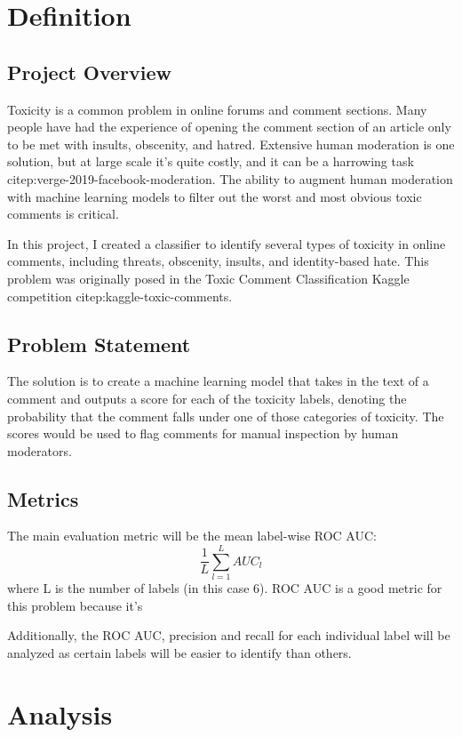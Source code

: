 \documentclass[12pt]{article}
\author{Andrew Pope}
\date{\today}
\title{}
\begin{document}
\section*{Definition}
\label{sec:org12d7149}

\subsection*{Project Overview}
\label{sec:org474a275}
Toxicity is a common problem in online forums and comment sections. Many people have had the experience of opening the comment section of an article only to be met with insults, obscenity, and hatred. Extensive human moderation is one solution, but at large scale it's quite costly, and it can be a harrowing task citep:verge-2019-facebook-moderation. The ability to augment human moderation with machine learning models to filter out the worst and most obvious toxic comments is critical.

In this project, I created a classifier to identify several types of toxicity in online comments, including threats, obscenity, insults, and identity-based hate. This problem was originally posed in the Toxic Comment Classification Kaggle competition citep:kaggle-toxic-comments. 
\subsection*{Problem Statement}
\label{sec:org96b759f}
The solution is to create a machine learning model that takes in the text of a comment and outputs a score for each of the toxicity labels, denoting the probability that the comment falls under one of those categories of toxicity. The scores would be used to flag comments for manual inspection by human moderators.
\subsection*{Metrics}
\label{sec:org0b5d578}
The main evaluation metric will be the mean label-wise ROC AUC:
\begin{equation}
\frac{1}{L} \sum_{l=1}^{L} AUC_{l}
\end{equation}
where L is the number of labels (in this case 6). ROC AUC is a good metric for this problem because it's 

Additionally, the ROC AUC, precision and recall for each individual label will be analyzed as certain labels will be easier to identify than others.
\section*{Analysis}
\label{sec:org8f1fbf1}
\end{document}

